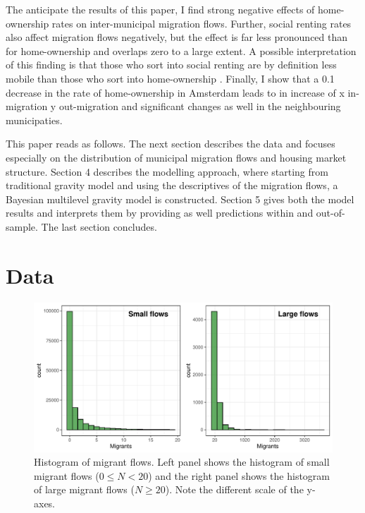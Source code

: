 \documentclass[fleqn,10pt]{SelfArx} %
\begin{document}
        The anticipate the results of this paper, I find strong negative effects
        of home-ownership rates on inter-municipal migration flows. Further,
        social renting rates also affect migration flows negatively, but the
        effect is far less pronounced than for home-ownership and overlaps zero
        to a large extent. A possible interpretation of this finding is that
        those who sort into social renting are by definition less mobile than
        those who sort into home-ownership \citep[this argument is put forward
        by][as well]{boyle1998migration}. Finally, I show that a 0.1 decrease in
        the rate of home-ownership in Amsterdam leads to in increase of x
        in-migration y out-migration and significant changes as well in the
        neighbouring municipaties.

        This paper reads as follows. The next section describes the data and
        focuses especially on the distribution of municipal migration flows and
        housing market structure. Section 4 describes the modelling
        approach, where starting from traditional gravity model and using the
        descriptives of the migration flows, a Bayesian multilevel gravity model
        is constructed. Section 5 gives both the model results and interprets
        them by providing as well predictions within and out-of-sample. The last
        section concludes.
        
        \section{Data}

        \begin{figure}[t!]\centering %
          \includegraphics[width=0.8\linewidth]{../fig/hist_mig.pdf}
          \caption{Histogram of migrant flows. Left panel shows the
            histogram of small migrant flows ($0 \leq N < 20$) and the right
            panel shows the histogram of large migrant flows
            ($N \geq 20$). Note the different scale of the y-axes.}
          \label{fig:hist_mig}
        \end{figure}
\end{document}
